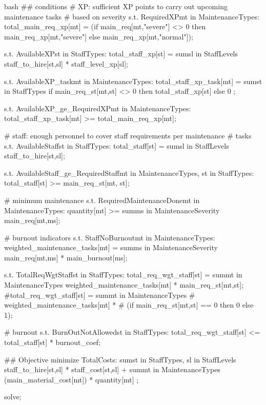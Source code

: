     \newpage
    \vspace{2pt}
    \begin{boxminted}{bash}
        ## conditions
        # XP: sufficient XP points to carry out upcoming maintenance tasks 
        # based on severity
        s.t. RequiredXP{mt in MaintenanceTypes}: 
            total_main_req_xp[mt] = (if main_req[mt,"severe"] <> 0 then 
                                        main_req_xp[mt,"severe"] 
                                        else main_req_xp[mt,"normal"]);
        
        s.t. AvailableXP{st in StaffTypes}:
            total_staff_xp[st] = sum{sl in StaffLevels} staff_to_hire[st,sl] * 
                                    staff_level_xp[sl];
        
        s.t. AvailableXP_task{mt in MaintenanceTypes}:
            total_staff_xp_task[mt] = sum{st in StaffTypes} 
                                        if main_req_st[mt,st] <> 0 then 
                                        total_staff_xp[st] else 0 ;
            
        s.t. AvailableXP_ge_RequiredXP{mt in MaintenanceTypes}:
            total_staff_xp_task[mt] >= total_main_req_xp[mt];
        
        # staff: enough personnel to cover staff requirements per maintenance 
        # tasks	
        s.t. AvailableStaff{st in StaffTypes}:
            total_staff[st] = sum{sl in StaffLevels} staff_to_hire[st,sl];
            
        s.t. AvailableStaff_ge_RequiredStaff{mt in MaintenanceTypes, 
        st in StaffTypes}:
            total_staff[st] >= main_req_st[mt, st];
        
        # minimum maintenance
        s.t. RequiredMaintenanceDone{mt in MaintenanceTypes}: 
            quantity[mt] >= sum{ms in MaintenanceSeverity} main_req[mt,ms];
        
        # burnout indicators
        s.t. StaffNoBurnout{mt in MaintenanceTypes}:
            weighted_maintenance_tasks[mt] = sum{ms in MaintenanceSeverity} 
                main_req[mt,ms] * main_burnout[ms];
        
        s.t. TotalReqWgtStaff{st in StaffTypes}:
            total_req_wgt_staff[st] = sum{mt in MaintenanceTypes} 
                weighted_maintenance_tasks[mt] * main_req_st[mt,st];
            #total_req_wgt_staff[st] = sum{mt in MaintenanceTypes} 
                # weighted_maintenance_tasks[mt] * 
                # (if main_req_st[mt,st] == 0 then 0 else 1);
        
        # burnout
        s.t. BurnOutNotAllowed{st in StaffTypes}:
            total_req_wgt_staff[st] <= total_staff[st] * burnout_coef;
        
        ## Objective
        minimize TotalCosts: 
            sum{st in StaffTypes, sl in StaffLevels} staff_to_hire[st,sl] * 
                staff_cost[st,sl] +
            sum{mt in MaintenanceTypes} (main_material_cost[mt]) * 
                quantity[mt] ;
        
        solve;
        
    \end{boxminted}
    \newpage

